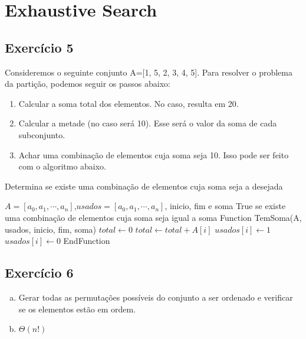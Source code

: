 
\section{Exhaustive Search}\label{sec:exhaustive_force}

\subsection{Exercício 5}\label{sec:exer5}
Consideremos o seguinte conjunto A=[1, 5, 2, 3, 4, 5]. Para resolver o problema da
partição, podemos seguir os passos abaixo:
\begin{enumerate}
  \item Calcular a soma total dos elementos. No caso, resulta em 20.
  \item Calcular a metade (no caso será 10). Esse será o valor da soma de cada
  subconjunto.
  \item Achar uma combinação de elementos cuja soma seja 10. Isso pode ser feito
  com o algoritmo abaixo.
\end{enumerate}

\begin{algorithm}
  \caption{Determina se existe uma combinação de elementos cuja soma seja a desejada}
  \begin{algorithmic}
    \REQUIRE $A=[a_{0}, a_{1}, \cdots, a_{n}]$,$usados=[a_{0}, a_{1}, \cdots, a_{n}]$,
    inicio, fim e soma
    \ENSURE True se existe uma combinação de elementos cuja soma seja igual a soma
    \STATE Function TemSoma(A, usados, inicio, fim, soma)
    \STATE $total \leftarrow 0$
        \STATE $total \leftarrow total + A[i]$
      \ENDIF
    \ENDFOR
      \RETURN \TRUE
    \ENDIF
      \STATE $usados[i] \leftarrow 1$
        \RETURN \TRUE
      \ENDIF
      \STATE $usados[i] \leftarrow 0$
    \ENDFOR
    \RETURN \FALSE
    \STATE EndFunction
  \end{algorithmic}
\end{algorithm}


\subsection{Exercício 6}\label{sec:exer6}
\begin{enumerate}[a)]
  \item Gerar todas as permutações possíveis do conjunto a ser ordenado e verificar
  se os elementos estão em ordem.
  \item $\Theta(n!)$
\end{enumerate}


